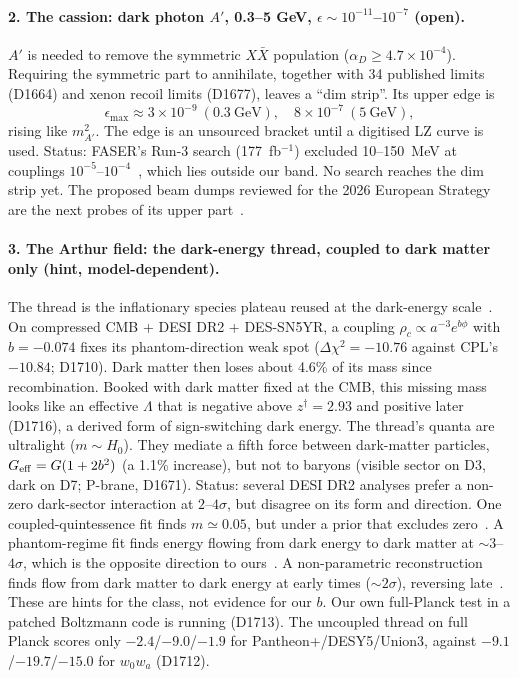 \documentclass[aps,prd,twocolumn,superscriptaddress,nofootinbib,showkeys]{revtex4-2}
\begin{document}
\paragraph*{2. The cassion: dark photon $A'$, 0.3--5 GeV, $\epsilon\sim10^{-11}$--$10^{-7}$ (open).}
$A'$ is needed to remove the symmetric $X\bar X$ population ($\alpha_D\ge4.7\times10^{-4}$). Requiring the symmetric part to annihilate, together with 34 published limits (D1664) and xenon recoil limits (D1677), leaves a ``dim strip''. Its upper edge is
\begin{equation}
\epsilon_{\max}\approx3\times10^{-9}\ (0.3~\mathrm{GeV}),\quad8\times10^{-7}\ (5~\mathrm{GeV}),
\end{equation}
rising like $m_{A'}^2$. The edge is an unsourced bracket until a digitised LZ curve is used. Status: FASER's Run-3 search (177~fb$^{-1}$) excluded 10--150~MeV at couplings $10^{-5}$--$10^{-4}$~\cite{FASER}, which lies outside our band. No search reaches the dim strip yet. The proposed beam dumps reviewed for the 2026 European Strategy are the next probes of its upper part~\cite{ESPP}.

\paragraph*{3. The Arthur field: the dark-energy thread, coupled to dark matter only (hint, model-dependent).}
The thread is the inflationary species plateau reused at the dark-energy scale~\cite{RT}. On compressed CMB + DESI DR2 + DES-SN5YR, a coupling $\rho_c\propto a^{-3}e^{b\phi}$ with $b=-0.074$ fixes its phantom-direction weak spot ($\Delta\chi^2=-10.76$ against CPL's $-10.84$; D1710). Dark matter then loses about 4.6\% of its mass since recombination. Booked with dark matter fixed at the CMB, this missing mass looks like an effective $\Lambda$ that is negative above $z^\dagger=2.93$ and positive later (D1716), a derived form of sign-switching dark energy. The thread's quanta are ultralight ($m\sim H_0$). They mediate a fifth force between dark-matter particles, $G_{\rm eff}=G(1+2b^2)$ (a 1.1\% increase), but not to baryons (visible sector on D3, dark on D7; P-brane, D1671).
Status: several DESI DR2 analyses prefer a non-zero dark-sector interaction at $2$--$4\sigma$, but disagree on its form and direction. One coupled-quintessence fit finds $m\simeq0.05$, but under a prior that excludes zero~\cite{CQ}. A phantom-regime fit finds energy flowing from dark energy to dark matter at $\sim3$--$4\sigma$, which is the opposite direction to ours~\cite{IDS}. A non-parametric reconstruction finds flow from dark matter to dark energy at early times ($\sim2\sigma$), reversing late~\cite{REV}. These are hints for the class, not evidence for our $b$. Our own full-Planck test in a patched Boltzmann code is running (D1713). The uncoupled thread on full Planck scores only $-2.4$/$-9.0$/$-1.9$ for Pantheon+/DESY5/Union3, against $-9.1$/$-19.7$/$-15.0$ for $w_0w_a$ (D1712).
\end{document}
